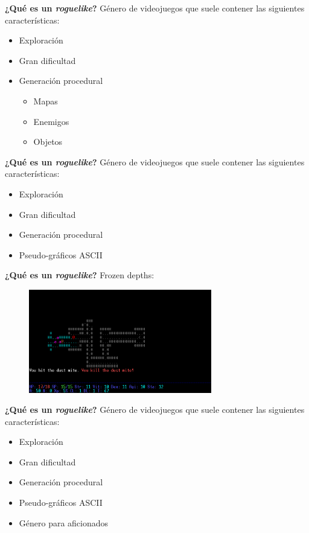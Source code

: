 \begin{tframe}{\textbf{¿Qué es un \textit{roguelike}?}}
	Género de videojuegos que suele contener las siguientes características:
	\begin{itemize}
		\item Exploración
		\item Gran dificultad
		\item<+-| alert@+> Generación procedural
		\begin{itemize}
			\item Mapas
			\item Enemigos
			\item Objetos
		\end{itemize}
	\end{itemize}
\end{tframe}

\begin{tframe}{\textbf{¿Qué es un \textit{roguelike}?}}
	Género de videojuegos que suele contener las siguientes características:
	\begin{itemize}
		\item Exploración
		\item Gran dificultad
		\item Generación procedural
		\item<+-| alert@+> Pseudo-gráficos ASCII
	\end{itemize}
\end{tframe}

\begin{tframe}{\textbf{¿Qué es un \textit{roguelike}?}}
	Frozen depths:
	\begin{figure}[h]
		\includegraphics[width=8cm]{../img/frozendepths}
	\end{figure}
\end{tframe}

\begin{tframe}{\textbf{¿Qué es un \textit{roguelike}?}}
	Género de videojuegos que suele contener las siguientes características:
	\begin{itemize}
		\item Exploración
		\item Gran dificultad
		\item Generación procedural
		\item Pseudo-gráficos ASCII
		\item<+-| alert@+> Género para aficionados
	\end{itemize}
\end{tframe}


